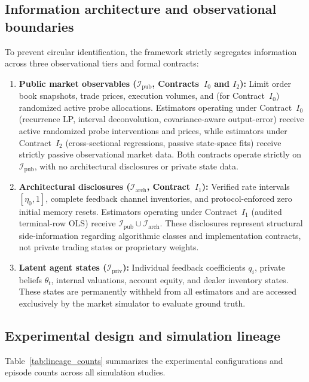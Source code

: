 \documentclass[10pt,twocolumn,letterpaper]{article}
\theoremstyle{definition}
\theoremstyle{remark}
\begin{document}
\subsection{Information architecture and observational boundaries}
To prevent circular identification, the framework strictly segregates information across three observational tiers and formal contracts:
\begin{enumerate}
    \item \textbf{Public market observables ($\mathcal{I}_{\mathrm{pub}}$, Contracts~$I_0$ and $I_2$):} Limit order book snapshots, trade prices, execution volumes, and (for Contract~$I_0$) randomized active probe allocations. Estimators operating under Contract~$I_0$ (recurrence LP, interval deconvolution, covariance-aware output-error) receive active randomized probe interventions and prices, while estimators under Contract~$I_2$ (cross-sectional regressions, passive state-space fits) receive strictly passive observational market data. Both contracts operate strictly on $\mathcal{I}_{\mathrm{pub}}$, with no architectural disclosures or private state data.
    \item \textbf{Architectural disclosures ($\mathcal{I}_{\mathrm{arch}}$, Contract~$I_1$):} Verified rate intervals $[\eta_0, 1]$, complete feedback channel inventories, and protocol-enforced zero initial memory resets. Estimators operating under Contract~$I_1$ (audited terminal-row OLS) receive $\mathcal{I}_{\mathrm{pub}} \cup \mathcal{I}_{\mathrm{arch}}$. These disclosures represent structural side-information regarding algorithmic classes and implementation contracts, not private trading states or proprietary weights.
    \item \textbf{Latent agent states ($\mathcal{I}_{\mathrm{priv}}$):} Individual feedback coefficients $q_i$, private beliefs $\theta_t$, internal valuations, account equity, and dealer inventory states. These states are permanently withheld from all estimators and are accessed exclusively by the market simulator to evaluate ground truth.
\end{enumerate}

\subsection{Experimental design and simulation lineage}
Table~\ref{tab:lineage_counts} summarizes the experimental configurations and episode counts across all simulation studies.
\end{document}
